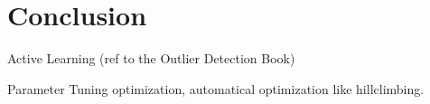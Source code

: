 \chapter{Conclusion}\label{Chapter:7}

Active Learning (ref to the Outlier Detection Book)

Parameter Tuning optimization, automatical optimization like hillclimbing.





